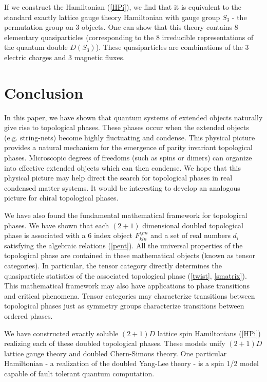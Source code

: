 \documentclass[aps,twocolumn,groupedaddress,showpacs,floatfix]{revtex4}
\begin{document}
If we construct the Hamiltonian (\ref{HPi}), we find that it
is equivalent to the standard exactly lattice gauge theory Hamiltonian 
\cite{K032} with gauge group $S_3$ - the permutation group on $3$ objects. One 
can show that this theory contains $8$ elementary quasiparticles 
(corresponding to the  $8$ irreducible representations of the quantum double 
$D(S_3)$). These quasiparticles are combinations of the $3$ electric charges 
and $3$ magnetic fluxes. 

\section{Conclusion}
In this paper, we have shown that quantum systems of extended objects
naturally give rise to topological phases. These phases occur when the extended
objects (e.g. string-nets) become highly fluctuating and condense. This
physical picture provides a natural mechanism for the emergence of 
parity invariant topological phases. Microscopic degrees of freedoms (such as 
spins or dimers) can organize into effective extended objects which can then 
condense. We hope that this physical picture may help direct the search for 
topological phases in real condensed matter systems. It would be interesting
to develop an analogous picture for chiral topological phases.

We have also found the fundamental mathematical framework for topological 
phases. We have shown that each $(2+1)$ dimensional doubled topological phase 
is associated with a $6$ index object $F^{ijm}_{kln}$ and a set of real numbers
$d_i$ satisfying the algebraic relations (\ref{pent}). All the universal 
properties of the topological phase are contained in these mathematical objects
(known as tensor categories). In particular, the tensor category directly 
determines the quasiparticle statistics of the associated topological phase
(\ref{twist}, \ref{smatrix}). This mathematical framework may also have 
applications to phase transitions and critical phenomena. Tensor 
categories may characterize transitions between topological phases 
just as symmetry groups characterize transitions between ordered phases.

We have constructed exactly soluble $(2+1)D$ lattice spin Hamiltonians
(\ref{HPi}) realizing each of these doubled topological phases. These models
unify $(2+1)D$ lattice gauge theory and doubled Chern-Simons theory.  
One particular Hamiltonian - a realization of the doubled Yang-Lee theory 
- is a spin 1/2 model capable of fault tolerant quantum computation.
\end{document}
